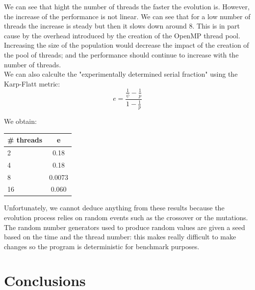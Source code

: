 \documentclass{acm_proc_article-sp}
\begin{document}
We can see that hight the number of threads the faster the evolution is. However, the increase of the performance is not linear. We can see that for a low number of threads the increase is steady but then it slows down around 8. This is in part cause by the overhead introduced by the creation of the OpenMP thread pool. Increasing the size of the population would decrease the impact of the creation of the pool of threads; and the performance should continue to increase with the number of threads. \\

\noindent
We can also calculte the "experimentally determined serial fraction" using the Karp-Flatt metric:
\begin{equation}
	e = \frac{\frac{1}{\psi} - \frac{1}{p}}{1 - \frac{1}{p}}
\end{equation}

We obtain:
\begin{center}
\begin{tabular}{|l|c|}
	\hline 
	\# threads & e \\ \hline
	2 & 0.18\\\hline
	4 & 0.18\\\hline
	8 & 0.0073\\\hline
	16 & 0.060\\ \hline
\end{tabular}

\end{center}

\noindent
Unfortunately, we cannot deduce anything from these results because the evolution process relies on random events such as the crossover or the mutations. The random number generators used to produce random values are given a seed based on the time and the thread number: this makes really difficult to make changes so the program is deterministic for benchmark purposes.
    
\section{Conclusions}




%

%
%
\end{document}
